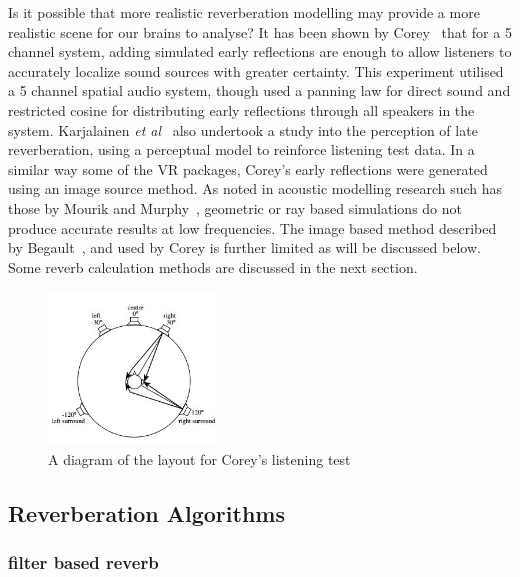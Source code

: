\documentclass[paper=a4, fontsize=10pt, font=arial]{scrartcl} %
\numberwithin{equation}{section} %
\numberwithin{figure}{section} %
\numberwithin{table}{section} %
\begin{document}
Is it possible that more realistic reverberation modelling may provide a more realistic scene for our brains to analyse? It has been shown by Corey~\cite{Corey2002} that for a 5 channel system, adding simulated early reflections are enough to allow listeners to accurately localize sound sources with greater certainty. This experiment utilised a 5 channel spatial audio system, though used a panning law for direct sound and restricted cosine for distributing early reflections through all speakers in the system. Karjalainen \textit{et al}~\cite{Karjalainen2001} also undertook a study into the perception of late reverberation, using a perceptual model to reinforce listening test data. In a similar way some of the VR packages, Corey's early reflections were generated using an image source method. As noted in acoustic modelling research such has those by Mourik and Murphy~\cite{Mourik2013}, geometric or ray based simulations do not produce accurate results at low frequencies. The image based method described by Begault~\cite{Begault1995}, and used by Corey is further limited as will be discussed below. Some reverb calculation methods are discussed in the next section.

\begin{figure}[H]
\centering
\includegraphics[width=0.4\textwidth]{coreydiagram.jpg}
\caption{A diagram of the layout for Corey's listening test\cite{Corey2002}}
\end{figure}

\newpage
\subsection{Reverberation Algorithms}
\subsubsection{filter based reverb}
\end{document}
